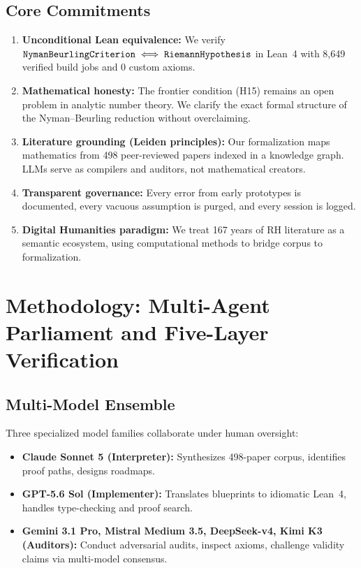 \documentclass[11pt,a4paper]{article}
\theoremstyle{plain}
\theoremstyle{definition}
\theoremstyle{remark}
\begin{document}
\subsection{Core Commitments}
\begin{enumerate}[label=\textbf{\arabic*.}]
  \item \textbf{Unconditional Lean equivalence:} We verify $\text{\texttt{NymanBeurlingCriterion}} \iff \text{\texttt{RiemannHypothesis}}$ in Lean~4 with 8,649 verified build jobs and 0 custom axioms.
  \item \textbf{Mathematical honesty:} The frontier condition (H15) remains an open problem in analytic number theory. We clarify the exact formal structure of the Nyman--Beurling reduction without overclaiming.
  \item \textbf{Literature grounding (Leiden principles):} Our formalization maps mathematics from 498 peer-reviewed papers indexed in a knowledge graph. LLMs serve as compilers and auditors, not mathematical creators.
  \item \textbf{Transparent governance:} Every error from early prototypes is documented, every vacuous assumption is purged, and every session is logged.
  \item \textbf{Digital Humanities paradigm:} We treat 167 years of RH literature as a semantic ecosystem, using computational methods to bridge corpus to formalization.
\end{enumerate}



\section{Methodology: Multi-Agent Parliament and Five-Layer Verification}
\label{sec:methodology}

\subsection{Multi-Model Ensemble}

Three specialized model families collaborate under human oversight:

\begin{itemize}[leftmargin=2em]
  \item \textbf{Claude Sonnet 5 (Interpreter):} Synthesizes 498-paper corpus, identifies proof paths, designs roadmaps.
  \item \textbf{GPT-5.6 Sol (Implementer):} Translates blueprints to idiomatic Lean~4, handles type-checking and proof search.
  \item \textbf{Gemini 3.1 Pro, Mistral Medium 3.5, DeepSeek-v4, Kimi K3 (Auditors):} Conduct adversarial audits, inspect axioms, challenge validity claims via multi-model consensus.
\end{itemize}
\end{document}
